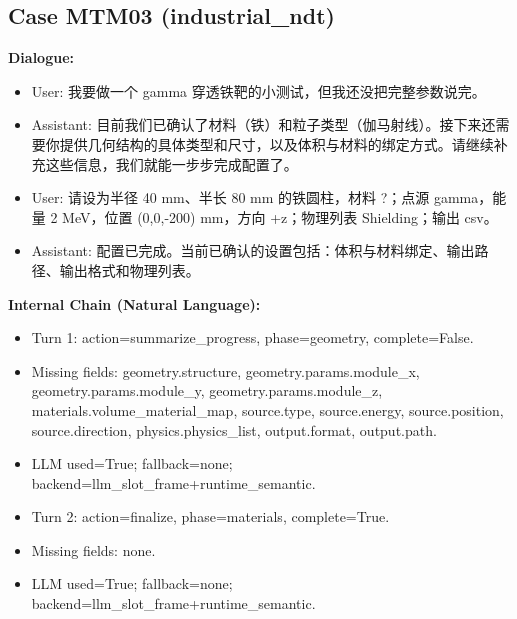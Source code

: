 \documentclass[11pt]{ctexart}
\begin{document}
\subsection{Case MTM03 (industrial\_ndt)}
\textbf{Dialogue:}
\begin{itemize}
\item User: 我要做一个 gamma 穿透铁靶的小测试，但我还没把完整参数说完。
\item Assistant: 目前我们已确认了材料（铁）和粒子类型（伽马射线）。接下来还需要你提供几何结构的具体类型和尺寸，以及体积与材料的绑定方式。请继续补充这些信息，我们就能一步步完成配置了。
\item User: 请设为半径 40 mm、半长 80 mm 的铁圆柱，材料 ?；点源 gamma，能量 2 MeV，位置 (0,0,-200) mm，方向 +z；物理列表 Shielding；输出 csv。
\item Assistant: 配置已完成。当前已确认的设置包括：体积与材料绑定、输出路径、输出格式和物理列表。
\end{itemize}
\textbf{Internal Chain (Natural Language):}
\begin{itemize}
\item Turn 1: action=summarize\_progress, phase=geometry, complete=False.
\item Missing fields: geometry.structure, geometry.params.module\_x, geometry.params.module\_y, geometry.params.module\_z, materials.volume\_material\_map, source.type, source.energy, source.position, source.direction, physics.physics\_list, output.format, output.path.
\item LLM used=True; fallback=none; backend=llm\_slot\_frame+runtime\_semantic.
\item Turn 2: action=finalize, phase=materials, complete=True.
\item Missing fields: none.
\item LLM used=True; fallback=none; backend=llm\_slot\_frame+runtime\_semantic.
\end{itemize}
\end{document}
